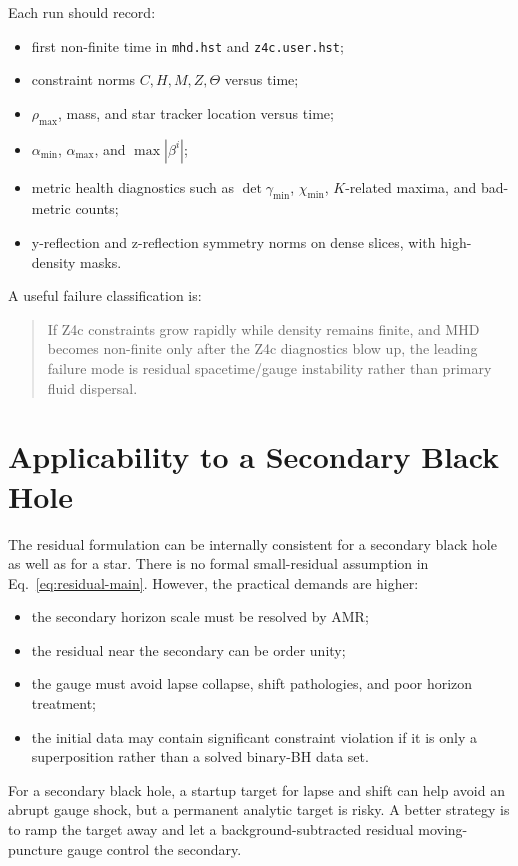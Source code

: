 \documentclass[11pt]{article}
\begin{document}
Each run should record:
\begin{itemize}
  \item first non-finite time in \verb|mhd.hst| and \verb|z4c.user.hst|;
  \item constraint norms \(C,H,M,Z,\Theta\) versus time;
  \item \(\rho_{\max}\), mass, and star tracker location versus time;
  \item \(\alpha_{\min}\), \(\alpha_{\max}\), and \(\max |\beta^i|\);
  \item metric health diagnostics such as \(\det\gamma_{\min}\),
  \(\chi_{\min}\), \(K\)-related maxima, and bad-metric counts;
  \item y-reflection and z-reflection symmetry norms on dense slices, with
  high-density masks.
\end{itemize}

A useful failure classification is:
\begin{quote}
If Z4c constraints grow rapidly while density remains finite, and MHD becomes
non-finite only after the Z4c diagnostics blow up, the leading failure mode is
residual spacetime/gauge instability rather than primary fluid dispersal.
\end{quote}

\section{Applicability to a Secondary Black Hole}

The residual formulation can be internally consistent for a secondary black
hole as well as for a star.  There is no formal small-residual assumption in
Eq.~\eqref{eq:residual-main}.  However, the practical demands are higher:
\begin{itemize}
  \item the secondary horizon scale must be resolved by AMR;
  \item the residual near the secondary can be order unity;
  \item the gauge must avoid lapse collapse, shift pathologies, and poor
  horizon treatment;
  \item the initial data may contain significant constraint violation if it is
  only a superposition rather than a solved binary-BH data set.
\end{itemize}

For a secondary black hole, a startup target for lapse and shift can help avoid
an abrupt gauge shock, but a permanent analytic target is risky.  A better
strategy is to ramp the target away and let a background-subtracted residual
moving-puncture gauge control the secondary.
\end{document}
